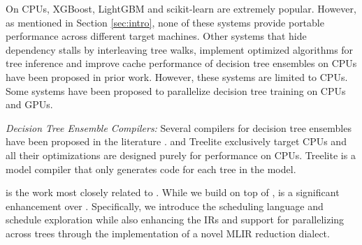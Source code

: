 On CPUs, XGBoost\cite{XGBoost}, LightGBM\cite{LightGBM} and
scikit-learn\cite{Sklearn} are extremely popular. However, 
as mentioned in Section \ref{sec:intro}, none of these systems
provide portable performance across different target machines.
Other systems that hide dependency stalls by interleaving tree walks\cite{VPred},
implement optimized algorithms for tree inference\cite{QuickScorer, QuickScorer1}
and improve cache performance of decision tree ensembles on CPUs\cite{CacheConscious1, CacheConscious2}
have been proposed in prior work. However, these systems are limited to CPUs.
Some systems have been proposed to parallelize decision tree training 
on CPUs and GPUs\cite{Jansson2014gpuRFAG, Nasridinov2013DecisionTC}.


\emph{Decision Tree Ensemble Compilers:}
Several compilers for decision tree ensembles have been proposed in the 
literature \cite{Treelite, Treebeard, Hummingbird}. \TreebeardOLD{} and Treelite
exclusively target CPUs and all their optimizations are designed purely for 
performance on CPUs. 
Treelite\cite{Treelite} is a model compiler that only  
generates  code for each tree in the model. 

\TreebeardOLD{} is the work most closely related to \Treebeard{}. While we 
build on top of \TreebeardOLD{}, \Treebeard{} is a significant enhancement 
over \TreebeardOLD{}. 
Specifically, we introduce the scheduling language and schedule exploration 
while also enhancing the IRs and support for parallelizing 
across trees through the implementation of a novel MLIR reduction dialect.

